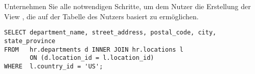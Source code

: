     \item Unternehmen Sie alle notwendigen Schritte, um dem Nutzer  die Erstellung der View , die auf der Tabelle  des Nutzers  basiert zu erm\"oglichen.
    \begin{lstlisting}[caption={Die View
    \identifier{v\_departments\_in\_usa}},language=oracle_sql,alsolanguage=sqlplus]
SELECT department_name, street_address, postal_code, city, state_province 
FROM   hr.departments d INNER JOIN hr.locations l
       ON (d.location_id = l.location_id)
WHERE  l.country_id = 'US';
    \end{lstlisting}
